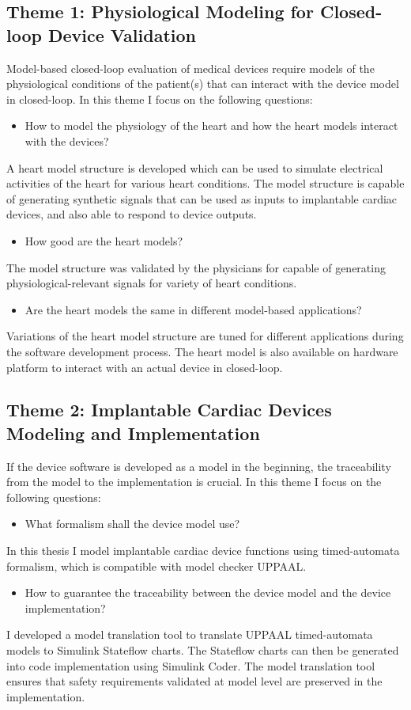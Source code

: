 \documentclass[a4paper]{article}
\begin{document}
\subsection*{Theme 1: Physiological Modeling for Closed-loop Device Validation}
Model-based closed-loop evaluation of medical devices require models of the physiological conditions of the patient(s) that can interact with the device model in closed-loop. 
In this theme I focus on the following questions:
\begin{itemize}
\item How to model the physiology of the heart and how the heart models interact with the devices?
\end{itemize}
A heart model structure is developed which can be used to simulate electrical activities of the heart for various heart conditions.
The model structure is capable of generating synthetic signals that can be used as inputs to implantable cardiac devices, and also able to respond to device outputs. 
\begin{itemize}
\item How good are the heart models?
\end{itemize}
The model structure was validated by the physicians for capable of generating physiological-relevant signals for variety of heart conditions.
\begin{itemize}
\item Are the heart models the same in different model-based applications?
\end{itemize}
Variations of the heart model structure are tuned for different applications during the software development process. 
The heart model is also available on hardware platform to interact with an actual device in closed-loop.

\subsection*{Theme 2: Implantable Cardiac Devices Modeling and Implementation}
If the device software is developed as a model in the beginning, the traceability from the model to the implementation is crucial. 
In this theme I focus on the following questions:
\begin{itemize}
\item What formalism shall the device model use?
\end{itemize}
In this thesis I model implantable cardiac device functions using timed-automata formalism, which is compatible with model checker UPPAAL.
\begin{itemize}
\item How to guarantee the traceability between the device model and the device implementation?
\end{itemize}
I developed a model translation tool to translate UPPAAL timed-automata models to Simulink Stateflow charts.
The Stateflow charts can then be generated into code implementation using Simulink Coder.
The model translation tool ensures that safety requirements validated at model level are preserved in the implementation.
\end{document}
